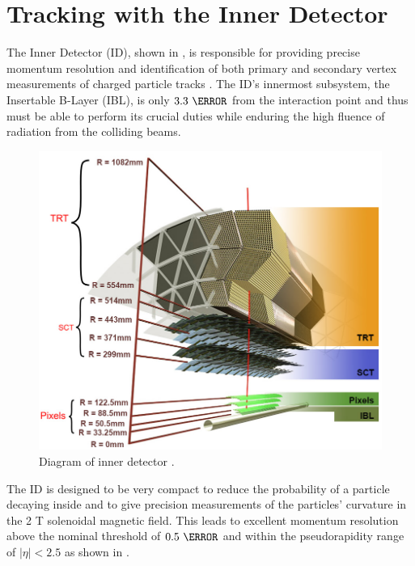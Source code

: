 \section{Tracking with the Inner Detector} \label{sec:atlas:tracking}

The Inner Detector (ID), shown in , is
responsible for providing precise momentum resolution and identification of
both primary and secondary vertex measurements of charged particle tracks
\cite{ATLAS-TDR-4,ATLAS-TDR-5}.  The ID's innermost subsystem, the Insertable
B-Layer (IBL), is only $3.3~\cm$ from the interaction point
\cite{Potamianos:2209070} and thus must be able to perform its crucial duties
while enduring the high fluence of radiation from the colliding beams.

\begin{figure}[!htbp]
  \begin{center}
    \includegraphics[width=0.8\linewidth]{figures/atlas/inner_detector_diagram}
    \caption{Diagram of inner detector \cite{Potamianos:2209070}.}
    \label{fig:inner_detector_diagram}
  \end{center}
\end{figure}

The ID is designed to be very compact to reduce the probability of a particle
decaying inside and to give precision measurements of the particles' curvature in
the 2 T solenoidal magnetic field. This leads to excellent momentum resolution
above the nominal \pT threshold of $0.5~\GeV$ and within the pseudorapidity range
of $|\eta| < 2.5$ as shown in .

